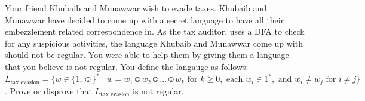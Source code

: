 \documentclass[addpoints]{exam}
\begin{document}
\begin{questions}



    \question[20] Your friend Khubaib and Munawwar wish to evade taxes. Khubaib and Munawwar have decided to come up with a secret language to have all their embezzlement related correspondence in. As the tax auditor, uses a DFA to check for any suspicious activities, the language Khubaib and Munawwar come up with should not be regular. You were able to help them by giving them a language that you believe is not regular. You define the langauge as follows: $L_{\text{tax evasion}} = \{ w \in \{1, \smiley \}^* \mid w = w_1\smiley w_2\smiley \dots \smiley w_k \text{ for } k \geq 0, \text{ each } w_i \in 1^*, \text{ and } w_i \neq w_j \text{ for } i \neq j \}$. Prove or disprove that $L_{\text{tax evasion}}$ is not regular.

    \begin{solution}
    \end{solution}

\end{questions}
\end{document}
